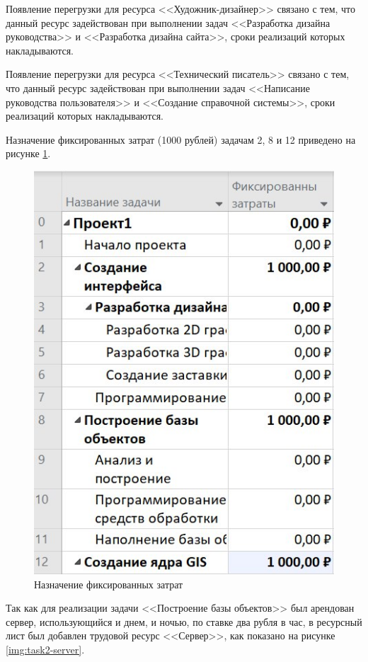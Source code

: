 Появление перегрузки для ресурса <<Художник-дизайнер>> связано с тем, что данный ресурс задействован при выполнении задач <<Разработка дизайна руководства>> и <<Разработка дизайна сайта>>, сроки реализаций которых накладываются.

Появление перегрузки для ресурса <<Технический писатель>> связано с тем, что данный ресурс задействован при выполнении задач <<Написание руководства пользователя>> и <<Создание справочной системы>>, сроки реализаций которых накладываются.

Назначение фиксированных затрат (1000 рублей) задачам 2, 8 и 12 приведено на рисунке \ref{img:task2-fixed-costs}.

\begin{figure}[H]
	\begin{center}
		\includegraphics[scale=0.42]{inc/img/task2-fixed-costs.jpg}
	\end{center}
	\captionsetup{justification=centering}
	\caption{Назначение фиксированных затрат}
	\label{img:task2-fixed-costs}
\end{figure}

Так как для реализации задачи <<Построение базы объектов>> был арендован сервер, использующийся и днем, и ночью, по ставке два рубля в час, в ресурсный лист был добавлен трудовой ресурс <<Сервер>>, как показано на рисунке \ref{img:task2-server}.

